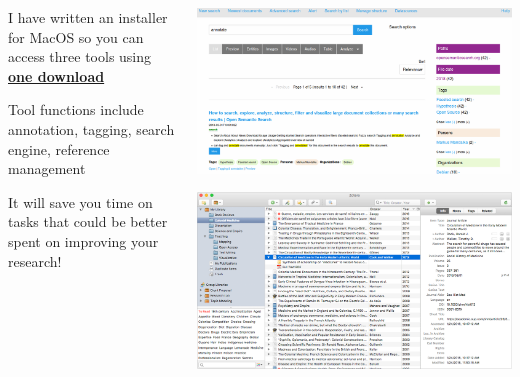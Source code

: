 \documentclass[unknownkeysallowed,usepdftitle=false, parskip=full, aspectratio=169]{beamer}
\newcommand{\secvariable}{nothing}
\begin{document}
\begin{frame}\label{\secvariable}
    \parbox{\linewidth}{

\begin{columns}[t]
\begin{column}[c]{0.5\textwidth}
      
      I have written an installer for MacOS so you can access three tools using \href{https://github.com/MQ-FOAR705/Osmond-Chiu---Proof-of-Concept---Implementation.git}{\textbf{one download}}
 
      \vspace{12pt}
      
      Tool functions include annotation, tagging, search engine, reference management
      
      \vspace{12pt}
 
      It will save you time on tasks that could be better spent on improving your research!

 \end{column}
    \begin{column}[c]{0.5\textwidth}

 
 \includegraphics[width=1\textwidth,height=0.25\textheight,keepaspectratio]{figure/OpenSemanticSearch.png}\\
 \vspace{12pt}
 
\includegraphics[width=1\textwidth,height=0.25\textheight,keepaspectratio]{figure/Zotero.png}\\
\vspace{12pt}
 

\end{column}
\end{columns}}
\end{frame}
\end{document}
